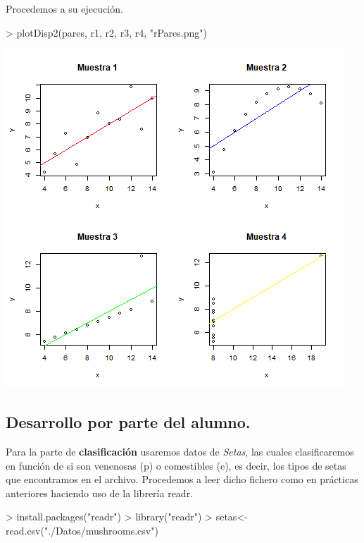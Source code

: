 \documentclass [a4paper] {article}
\begin{document}
\bigskip
Procedemos a su ejecución.
\begin{Schunk}
\begin{Sinput}
> plotDisp2(pares, r1, r2, r3, r4, "rPares.png")
\end{Sinput}
\end{Schunk}
\includegraphics[width=\textwidth]{rPares}

\subsection{Desarrollo por parte del alumno.}

\bigskip
Para la parte de \textbf{clasificación} usaremos datos de \textit{Setas}, las cuales clasificaremos en función de si son venenosas (p) o 
comestibles (e), es decir, los tipos de setas que encontramos en el archivo. Procedemos a leer dicho fichero como en prácticas anteriores
haciendo uso de la librería readr.
\begin{Schunk}
\begin{Sinput}
> install.packages("readr")
> library("readr")
> setas<-read.csv("./Datos/mushrooms.csv")
\end{Sinput}
\end{Schunk}
\end{document}
